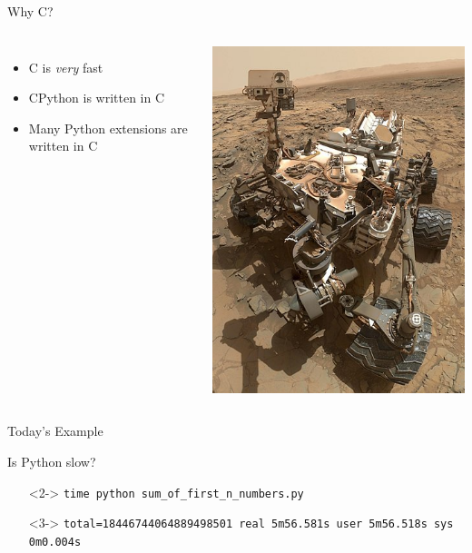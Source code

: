 \documentclass[12pt, aspectration=169]{beamer}
\begin{document}
    \begin{frame}{Why C?}
        \begin{columns}
            \begin{itemize}
                \item C is \textit{very} fast
                \item CPython is written in C
                \item Many Python extensions are written in C
            \end{itemize}
            \includegraphics[scale=0.35]{static/images/390px-Curiosity_Self-Portrait_at_'Big_Sky'_Drilling_Site}
        \end{columns}
    \end{frame}
    \begin{frame}{Today's Example}
        
    \end{frame}

    \begin{frame}{Is Python slow?}
        \begin{itemize}
            \item[]<2-> \texttt{time python sum\_of\_first\_n\_numbers.py\newline}
            \item[]<3-> \texttt{total=18446744064889498501\newline
            real 5m56.581s\newline
            user 5m56.518s\newline
            sys 0m0.004s\newline}
        \end{itemize}
    \end{frame}
\end{document}
